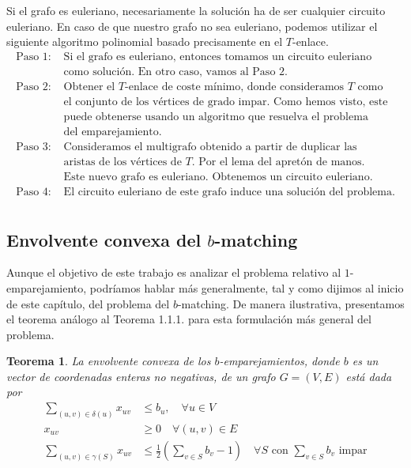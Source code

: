 \documentclass[twoside,a4paper,openright,12pt,tikz]{book}
\newtheorem{thm}{Teorema}[section]
\begin{document}
Si el grafo es euleriano, necesariamente la solución ha de ser cualquier circuito euleriano. En caso de que nuestro grafo no sea euleriano, podemos utilizar el siguiente algoritmo polinomial basado precisamente en el $T$-enlace.
\begin{align*}
\text{Paso 1: }& \text{Si el grafo es euleriano, entonces tomamos un circuito euleriano}\\
&\text{como solución. En otro caso, vamos al Paso 2.}\\
\text{Paso 2: }&\text{Obtener el $T$-enlace de coste mínimo, donde consideramos $T$ como}\\
&\text{el conjunto de los vértices de grado impar. Como hemos visto, este}\\
&\text{puede obtenerse usando un algoritmo que resuelva el problema}\\
&\text{del emparejamiento.}\\
\text{Paso 3: }&\text{Consideramos el multigrafo obtenido a partir de duplicar las}\\
&\text{aristas de los vértices de $T$. Por el lema del apretón de manos.}\\
&\text{Este nuevo grafo es euleriano. Obtenemos un circuito euleriano.}\\
\text{Paso 4: }& \text{El circuito euleriano de este grafo induce una solución del problema.}\\
\end{align*} 
\subsection{Envolvente convexa del $b$-matching}
Aunque el objetivo de este trabajo es analizar el problema relativo al $1$-emparejamiento, podríamos hablar más generalmente, tal y como dijimos al inicio de este capítulo, del problema del $b$-matching. De manera ilustrativa, presentamos el teorema análogo al Teorema 1.1.1. para esta formulación más general del problema. 
\begin{thm}
La envolvente convexa de los $b$-emparejamientos, donde $b$ es un vector de coordenadas enteras no negativas, de un grafo $G=(V,E)$ está dada por
\begin{align*}
\sum_{(u,v)\in\delta(u)} x_{uv} &\leq b_u, \quad \forall u\in V\\
x_{uv} &\geq 0 \quad \forall(u,v)\in E\\
\sum_{(u,v)\in \gamma(S)} x_{uv}& \leq \frac{1}{2}\left(\sum_{v\in S} b_v -1\right) \quad \forall S \text{ con $\sum_{v\in S} b_v$ impar}
\end{align*}
\end{thm}
\end{document}

